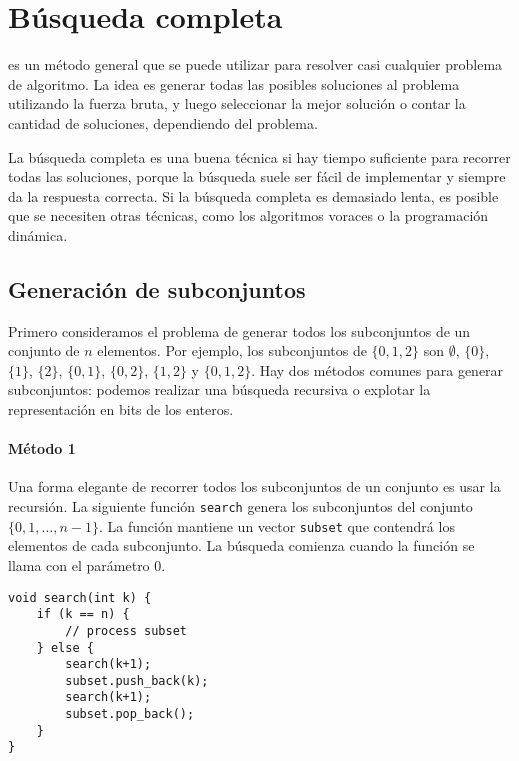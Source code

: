 \chapter{Búsqueda completa}

es un método general que se puede utilizar
para resolver casi cualquier problema de algoritmo.
La idea es generar todas las posibles
soluciones al problema utilizando la fuerza bruta,
y luego seleccionar la mejor solución o contar la
cantidad de soluciones, dependiendo del problema.

La búsqueda completa es una buena técnica
si hay tiempo suficiente para recorrer todas las soluciones,
porque la búsqueda suele ser fácil de implementar
y siempre da la respuesta correcta.
Si la búsqueda completa es demasiado lenta,
es posible que se necesiten otras técnicas, como los algoritmos voraces o
la programación dinámica.

\section{Generación de subconjuntos}


Primero consideramos el problema de generar
todos los subconjuntos de un conjunto de $n$ elementos.
Por ejemplo, los subconjuntos de $\{0,1,2\}$ son
$\emptyset$, $\{0\}$, $\{1\}$, $\{2\}$, $\{0,1\}$,
$\{0,2\}$, $\{1,2\}$ y $\{0,1,2\}$.
Hay dos métodos comunes para generar subconjuntos:
podemos realizar una búsqueda recursiva
o explotar la representación en bits de los enteros.

\subsubsection{Método 1}

Una forma elegante de recorrer todos los subconjuntos
de un conjunto es usar la recursión.
La siguiente función \texttt{search}
genera los subconjuntos del conjunto
$\{0,1,\ldots,n-1\}$.
La función mantiene un vector \texttt{subset}
que contendrá los elementos de cada subconjunto.
La búsqueda comienza cuando la función se llama
con el parámetro 0.

\begin{lstlisting}
void search(int k) {
    if (k == n) {
        // process subset
    } else {
        search(k+1);
        subset.push_back(k);
        search(k+1);
        subset.pop_back();
    }
}
\end{lstlisting}

